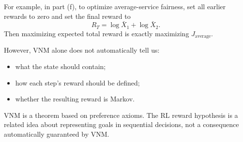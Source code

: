 \documentclass[11pt,a4paper]{article}
\begin{document}
For example, in part (f), to optimize average-service fairness, set all
earlier rewards to zero and set the final reward to
\[
R_T=\log \bar X_1+\log \bar X_2.
\]
Then maximizing expected total reward is exactly maximizing
\(J_{\mathrm{average}}\).

However, VNM alone does not automatically tell us:
\begin{itemize}
\item what the state should contain;
\item how each step's reward should be defined;
\item whether the resulting reward is Markov.
\end{itemize}
VNM is a theorem based on preference axioms. The RL reward hypothesis is a
related idea about representing goals in sequential decisions, not a
consequence automatically guaranteed by VNM.
\end{document}
